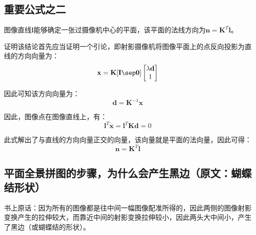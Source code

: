 \documentclass[11pt]{article}
\begin{document}
\subsection{重要公式之二}
{\heiti 图像直线$\mathbf{l}$能够确定一张过摄像机中心的平面，该平面的法线方向为$\mathbf{n=K^\mathit{T}l}$}。\par
{}\par
证明该结论首先应当证明一个引论，即射影摄像机将图像平面上的点反向投影为直线的方向向量为：
\begin{equation*}
  \mathbf{x}=\mathbf{K[I\sep 0]}\begin{bmatrix}
    \lambda\mathbf{d} \\1
  \end{bmatrix}
\end{equation*}\par
因此可知该方向向量为：
\begin{equation*}
  \mathbf{d}=\mathbf{K}^{-1}\mathbf{x}
\end{equation*}\par
因此，图像点在图像直线上，有：
\begin{equation*}
  \mathbf{l^\mathit{T}x}=\mathbf{l^\mathit{T}K}\mathbf{d}=0
\end{equation*}\par
此式解出了与直线的方向向量正交的向量，该向量就是平面的法向量，因此可得：
\begin{equation*}
  \mathbf{n}=\mathbf{K}^T\mathbf{l}
\end{equation*}\par
\subsection{平面全景拼图的步骤，为什么会产生黑边（原文：蝴蝶结形状）}
\label{subsec:平面全景拼图的步骤，为什么会产生黑边（原文：蝴蝶结形状）}
书上原话：因为所有的图像都是往中间一幅图像配准所得的，因此两侧的图像射影变换产生的拉伸较大，而靠近中间的射影变换拉伸较小，因此两头大中间小，产生了黑边（或蝴蝶结的形状）。
\end{document}
